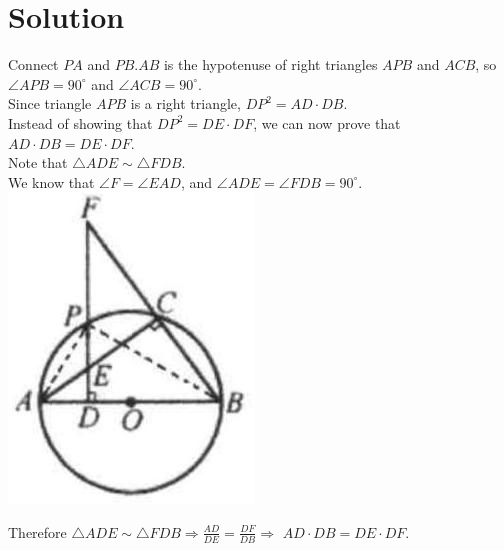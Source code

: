 \documentclass{article}
\begin{document}
\section*{Solution}
Connect \(P A\) and \(P B . A B\) is the hypotenuse of right triangles \(A P B\) and \(A C B\), so \(\angle A P B=90^{\circ}\) and \(\angle A C B=90^{\circ}\).\\
Since triangle \(A P B\) is a right triangle, \(D P^{2}=A D \cdot D B\).\\
Instead of showing that \(D P^{2}=D E \cdot D F\), we can now prove that \(A D \cdot D B=D E \cdot D F\).\\
Note that \(\triangle A D E \sim \triangle F D B\).\\
We know that \(\angle F=\angle E A D\), and \(\angle A D E=\angle F D B=90^{\circ}\).\\
\centering
\includegraphics[width=\textwidth]{images/reasoning_image_1.jpg}

Therefore \(\triangle A D E \sim \triangle F D B \Rightarrow \frac{A D}{D E}=\frac{D F}{D B} \Rightarrow\) \(A D \cdot D B=D E \cdot D F\).
\end{document}

